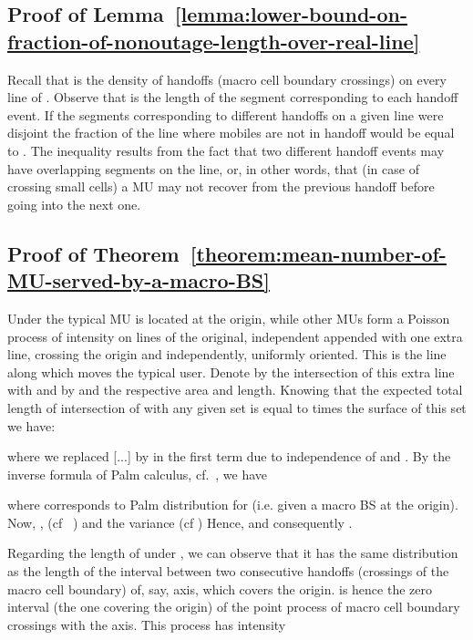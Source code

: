 \documentclass[10pt,journal]{IEEEtran}
\begin{document}
\subsection{Proof of Lemma~\ref{lemma:lower-bound-on-fraction-of-nonoutage-length-over-real-line}}
\label{subsection:proof-of-lower-bound-on-fraction-of-nonoutage-length-over-real-line}
Recall that  is the density of handoffs (macro cell boundary
crossings)  on every line of . Observe that  is the length of
the segment  corresponding to each handoff event. 
If the segments corresponding to
different handoffs on a given line  were disjoint the fraction of the
line where mobiles are not in handoff would be equal to
. The inequality results from the fact that 
two different handoff events may have overlapping segments on the
line, or, in other words, that (in case of crossing small cells) a MU may not recover from the previous
handoff before going into the next one. 


 \subsection{Proof of Theorem~\ref{theorem:mean-number-of-MU-served-by-a-macro-BS}}
\label{subsection:proof-of-mean-number-of-MU-theorem}
Under  the typical MU is located at the origin, while
other MUs form a Poisson process of intensity  on lines
of the original, independent  appended with one extra line, crossing the origin and
independently, uniformly oriented. This is the line  along which
moves the typical user.  
Denote by  the  intersection of this extra
line with  and by   and 
the respective area and  length.
 Knowing that the expected total length of intersection
of  with any given set is equal to  times
the surface of this set we have: 

where we replaced [...] by  in the first term due
to independence of  and .
By the inverse formula of Palm calculus, cf.~\cite[Theorem 4.1 and
  Corollary 4.4]{FnT1}, we have

where  corresponds to Palm distribution for
 (i.e. given a macro BS at the origin).
 Now, , (cf ~\cite[Corollary 4.3]{FnT1})
and  the variance 
(cf \cite[Table~]{chiu-etal13stochastic-geometry-and-its-applications})
Hence, 
and consequently .

Regarding the length of  under , we can observe that it
has the same distribution as the length 
of the interval  between two consecutive handoffs
(crossings of the macro cell boundary) of, say,  axis, which
covers the origin.  is hence the zero interval
(the one covering the origin) of the point process of macro cell boundary
crossings with the  axis. This process has intensity 
\end{document}
